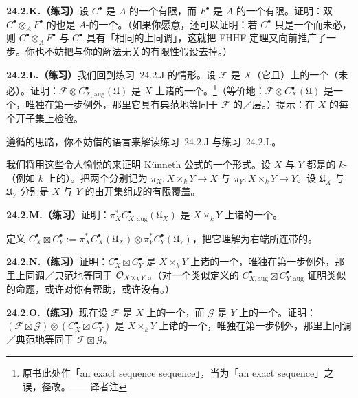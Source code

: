 \textbf{24.2.K.（练习）}\quad 设 $C^\bullet$ 是 $A$-\trModule{}的一个有限\trExactSequence，而 $F^\bullet$ 是\trFlat{} $A$-\trModule{}的一个有限\trExactSequence。证明：双\trComplexN{} $C^\bullet\otimes_A F^\bullet$ 的\trTotalComplex{}也是 $A$-\trModule{}的一个\trExactSequence。（如果你愿意，还可以证明：若 $C^\bullet$ 只是一个\trComplexN{}而未必\trExact，则 $C^\bullet\otimes_A F^\bullet$ 与 $C^\bullet$ 具有「相同的上同调」，这就把 FHHF 定理又向前推广了一步。你也不妨把与你的解法无关的有限性假设去掉。）

\textbf{24.2.L.（练习）}\quad 我们回到\mbox{练习~24.2.J} 的情形。设 $\mathscr{F}$ 是 $X$（它\trQuasicompact{}且\trSeparated）上的一个\trQCSheaf（未必\trFlat）。证明：$\mathscr{F}\otimes C^{\bullet}_{X,\mathrm{aug}}(\mathfrak{U})$ 是 $X$ 上诸\trQCSheaf{}的一个\trExactSequence。\footnote{原书此处作「an exact sequence sequence」，当为「an exact sequence」之误，径改。——译者注}（等价地：$\mathscr{F}\otimes C^{\bullet}_X(\mathfrak{U})$ 是一个\trComplexN，唯独在第一步例外，那里它具有典范地等同于 $\mathscr{F}$ 的\trKernel／\trCohomology{}层。）提示：在 $X$ 的每个\trAffine{}开子集上检验。

遵循\trSerre{}的思路，你不妨借\trPartitionOfUnity{}的语言来解读\mbox{练习~24.2.J} 与\mbox{练习~24.2.L}。

我们将用这些令人愉悦的\trExactSequence 来证明 K\"unneth 公式的一个形式。设 $X$ 与 $Y$ 都是\trQuasicompact\trSeparated{}的 $k$-\trScheme（例如 $k$ 上的\trVariety）。把两个\trProjection{}分别记为 $\pi_X\colon X\times_k Y\to X$ 与 $\pi_Y\colon X\times_k Y\to Y$。设 $\mathfrak{U}_X$ 与 $\mathfrak{U}_Y$ 分别是 $X$ 与 $Y$ 的由\trAffine{}开集组成的有限覆盖。

\textbf{24.2.M.（练习）}\quad 证明：$\pi_X^* C^{\bullet}_{X,\mathrm{aug}}(\mathfrak{U}_X)$ 是 $X\times_k Y$ 上诸\trFlat\trQCSheaf{}的一个\trExact\trComplexN。

定义 $C^{\bullet}_X\boxtimes C^{\bullet}_Y:=\pi_X^* C^{\bullet}_X(\mathfrak{U}_X)\otimes\pi_Y^* C^{\bullet}_Y(\mathfrak{U}_Y)$，把它理解为右端\trDoubleComplex{}所连带的\trTotalComplex。

\textbf{24.2.N.（练习）}\quad 证明：$C^{\bullet}_X\boxtimes C^{\bullet}_Y$ 是 $X\times_k Y$ 上诸\trFlat\trQCSheaf{}的一个\trComplexN，唯独在第一步例外，那里上同调／\trKernel{}典范地等同于 $\mathcal{O}_{X\times_k Y}$。（对一个类似定义的 $C^{\bullet}_{X,\mathrm{aug}}\boxtimes C^{\bullet}_{Y,\mathrm{aug}}$ 证明类似的命题，或许对你有帮助，或许没有。）

\textbf{24.2.O.（练习）}\quad 现在设 $\mathscr{F}$ 是 $X$ 上的一个\trQCSheaf，而 $\mathscr{G}$ 是 $Y$ 上的一个\trQCSheaf。证明：$(\mathscr{F}\boxtimes\mathscr{G})\otimes(C^{\bullet}_X\boxtimes C^{\bullet}_Y)$ 是 $X\times_k Y$ 上诸\trQCSheaf{}的一个\trComplexN，唯独在第一步例外，那里上同调／\trKernel{}典范地等同于 $\mathscr{F}\boxtimes\mathscr{G}$。

